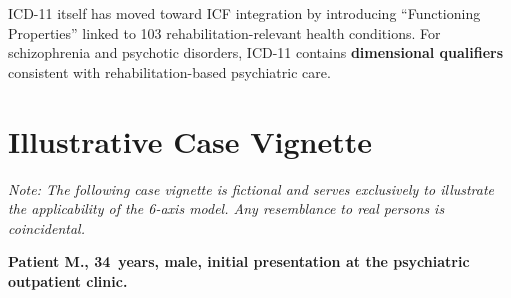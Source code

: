\documentclass[11pt,a4paper]{article}
\begin{document}
ICD-11 itself has moved toward ICF integration by introducing ``Functioning Properties'' linked to 103 rehabilitation-relevant health conditions. For schizophrenia and psychotic disorders, ICD-11 contains \textbf{dimensional qualifiers} consistent with rehabilitation-based psychiatric care.

\section{Illustrative Case Vignette}
\label{sec:vignette}

\textit{Note: The following case vignette is fictional and serves exclusively to illustrate the applicability of the 6-axis model. Any resemblance to real persons is coincidental.}

\vspace{0.5em}
\noindent \textbf{Patient M., 34~years, male, initial presentation at the psychiatric outpatient clinic.}
\end{document}
